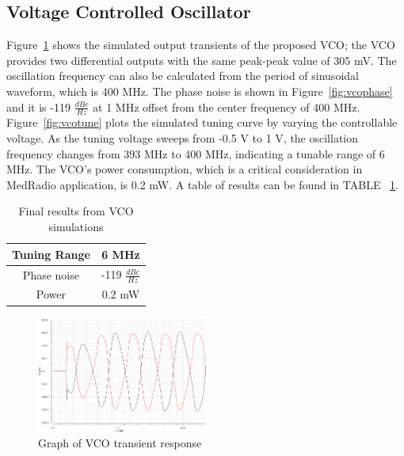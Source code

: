 \subsection{Voltage Controlled Oscillator}
Figure~\ref{fig:vcotrans} shows the simulated output transients of the proposed VCO; the VCO provides two differential outputs with the same peak-peak value of 305 mV. The oscillation frequency can also be calculated from the period of sinusoidal waveform, which is 400 MHz. The phase noise is shown in Figure~\ref{fig:vcophase} and it is -119 $\frac{dBc}{Hz}$ at 1 MHz offset from the center frequency of 400 MHz. Figure~\ref{fig:vcotune} plots the simulated tuning curve by varying the controllable voltage. As the tuning voltage sweeps from -0.5 V to 1 V, the oscillation frequency changes from 393 MHz to 400 MHz, indicating a tunable range of 6 MHz. The VCO’s power consumption, which is a critical consideration in MedRadio application, is 0.2 mW. A table of results can be found in TABLE ~\ref{tab:vcoresults}.

\begin{table}[h]
\begin{center}
	\begin{tabular}{ c | c  }

  		Tuning Range &  6 MHz \\ \hline
  		Phase noise &  -119 $\frac{dBc}{Hz}$ \\ \hline
		Power & 0.2 mW \\ 

	\end{tabular}

\end{center}
\caption{Final results from VCO simulations}
\label{tab:vcoresults}
\end{table}

\begin{figure}[h]
   \centering
    \includegraphics[width=0.5\textwidth]{figures/VCOTrans.png}
    \caption{Graph of VCO transient response}
    \label{fig:vcotrans}
\end{figure}

